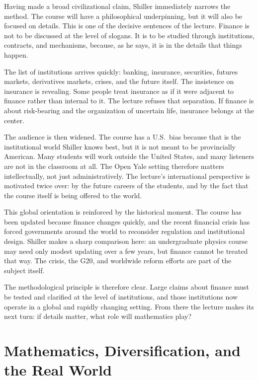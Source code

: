 Having made a broad civilizational claim, Shiller immediately narrows the method. The course will have a philosophical underpinning, but it will also be focused on details. This is one of the decisive sentences of the lecture. Finance is not to be discussed at the level of slogans. It is to be studied through institutions, contracts, and mechanisms, because, as he says, it is in the details that things happen.

The list of institutions arrives quickly: banking, insurance, securities, futures markets, derivatives markets, crises, and the future itself. The insistence on insurance is revealing. Some people treat insurance as if it were adjacent to finance rather than internal to it. The lecture refuses that separation. If finance is about risk-bearing and the organization of uncertain life, insurance belongs at the center.

The audience is then widened. The course has a U.S.\ bias because that is the institutional world Shiller knows best, but it is not meant to be provincially American. Many students will work outside the United States, and many listeners are not in the classroom at all. The Open Yale setting therefore matters intellectually, not just administratively. The lecture's international perspective is motivated twice over: by the future careers of the students, and by the fact that the course itself is being offered to the world.

This global orientation is reinforced by the historical moment. The course has been updated because finance changes quickly, and the recent financial crisis has forced governments around the world to reconsider regulation and institutional design. Shiller makes a sharp comparison here: an undergraduate physics course may need only modest updating over a few years, but finance cannot be treated that way. The crisis, the G20, and worldwide reform efforts are part of the subject itself.

The methodological principle is therefore clear. Large claims about finance must be tested and clarified at the level of institutions, and those institutions now operate in a global and rapidly changing setting. From there the lecture makes its next turn: if details matter, what role will mathematics play?

\section{Mathematics, Diversification, and the Real World}

